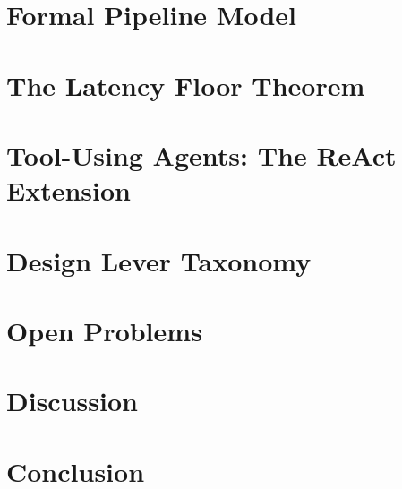 \documentclass[11pt,a4paper]{article}
\theoremstyle{definition}
\begin{document}
\section{Formal Pipeline Model}
\label{sec:pipeline_model}


\section{The Latency Floor Theorem}
\label{sec:latency_floor}


\section{Tool-Using Agents: The ReAct Extension}
\label{sec:react_extension}


\section{Design Lever Taxonomy}
\label{sec:design_levers}


\section{Open Problems}
\label{sec:open_problems}


\section{Discussion}
\label{sec:discussion}


\section{Conclusion}
\label{sec:conclusion}




\end{document}
